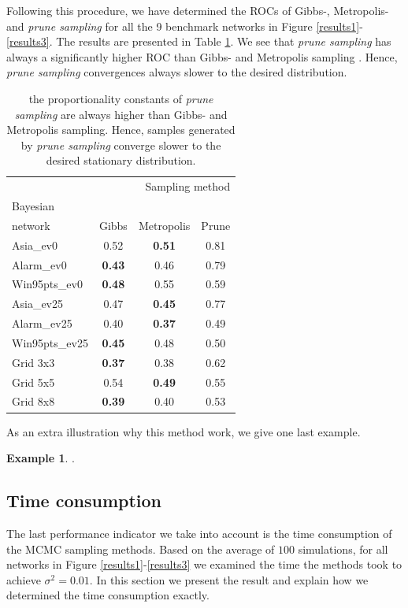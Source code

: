 \documentclass[a4paper, twoside, 11pt]{report}
\theoremstyle{plain}
\theoremstyle{definition}
\newtheorem{example}[thm]{Example}
\theoremstyle{remark}
\newcommand{\ps}{\textit{prune sampling }}
\begin{document}
Following this procedure, we have determined the ROCs of Gibbs-, Metropolis- and \ps for all the 9 benchmark networks in Figure \ref{results1}-\ref{results3}. The results are presented in Table \ref{ROC-table}. We see that \ps has always a significantly higher ROC than Gibbs- and Metropolis sampling . Hence, \ps convergences always slower to the desired distribution.
\begin{center}
\begin{table}[H]
\begin{center}
\begin{tabular}{l c c c}  
\toprule
\multicolumn{4}{r}{Sampling method} \\
\cmidrule(r){2-4}
Bayesian \\ network    & Gibbs    & Metropolis & Prune  \\
\midrule
Asia\_ev0 & 0.52 & \textbf{0.51} & 0.81  \\
Alarm\_ev0 & \textbf{0.43} & 0.46 & 0.79  \\
Win95pts\_ev0 & \textbf{0.48} & 0.55 & 0.59  \\
Asia\_ev25 & 0.47 & \textbf{0.45} & 0.77  \\
Alarm\_ev25 & 0.40 & \textbf{0.37} & 0.49  \\
Win95pts\_ev25 & \textbf{0.45} & 0.48 & 0.50  \\
Grid 3x3 & \textbf{0.37} & 0.38 & 0.62  \\
Grid 5x5 & 0.54 & \textbf{0.49} & 0.55  \\
Grid 8x8 & \textbf{0.39} & 0.40 & 0.53  \\
\bottomrule
\end{tabular}
\caption{the proportionality constants of \ps are always higher than Gibbs- and Metropolis sampling. Hence, samples generated by \ps converge slower to the desired stationary distribution.}
\label{ROC-table}
\end{center}
\end{table}
\end{center}
As an extra illustration why this method work, we give one last example.
\begin{example}
.
\end{example}

\subsection{Time consumption}\label{sec:time-cons}
The last performance indicator we take into account is the time consumption of the MCMC sampling methods. Based on the average of $100$ simulations, for all networks in Figure \ref{results1}-\ref{results3} we examined the time the methods took to achieve $\sigma^2 = 0.01$. In this section we present the result and explain how we determined the time consumption exactly. \\
\end{document}
